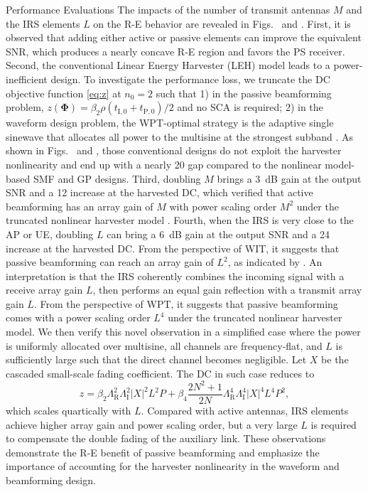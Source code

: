 \documentclass[journal]{IEEEtran}
\begin{document}
\begin{section}{Performance Evaluations}
		The impacts of the number of transmit antennas $M$ and the IRS elements $L$ on the R-E behavior are revealed in Figs.~ and . First, it is observed that adding either active or passive elements can improve the equivalent SNR, which produces a nearly concave R-E region and favors the PS receiver. Second, the conventional Linear Energy Harvester (LEH) model leads to a power-inefficient design. To investigate the performance loss, we truncate the DC objective function \eqref{eq:z} at $n_0=2$ such that 1) in the passive beamforming problem, $z(\boldsymbol{\Phi}) = {\beta_2}{\rho}(t_{\mathrm{I},0}+t_{\mathrm{P},0})/2$ and no SCA is required; 2) in the waveform design problem, the WPT-optimal strategy is the adaptive single sinewave that allocates all power to the multisine at the strongest subband \cite{Clerckx2016a}. As shown in Figs.~ and , those conventional designs do not exploit the harvester nonlinearity and end up with a nearly \SI{20}{\dBA} gap compared to the nonlinear model-based SMF and GP designs. Third, doubling $M$ brings a \SI{3}{\dB} gain at the output SNR and a \SI{12}{\dBA} increase at the harvested DC, which verified that active beamforming has an array gain of $M$ \cite{Tse2005} with power scaling order $M^2$ under the truncated nonlinear harvester model \cite{Clerckx2016a,Clerckx2018b}. Fourth, when the IRS is very close to the AP or UE, doubling $L$ can bring a \SI{6}{\dB} gain at the output SNR and a \SI{24}{\dBA} increase at the harvested DC. From the perspective of WIT, it suggests that passive beamforming can reach an array gain of $L^2$, as indicated by \cite{Wu2019}. An interpretation is that the IRS coherently combines the incoming signal with a receive array gain $L$, then performs an equal gain reflection with a transmit array gain $L$. From the perspective of WPT, it suggests that passive beamforming comes with a power scaling order $L^4$ under the truncated nonlinear harvester model. We then verify this novel observation in a simplified case where the power is uniformly allocated over multisine, all channels are frequency-flat, and $L$ is sufficiently large such that the direct channel becomes negligible. Let $X$ be the cascaded small-scale fading coefficient. The DC in such case reduces to
		\begin{equation}
			z = \beta_2 \Lambda_{\mathrm{R}}^2 \Lambda_{\mathrm{I}}^2 \lvert X \rvert^2 L^2 P + \beta_4 \frac{2N^2 + 1}{2N} \Lambda_{\mathrm{R}}^4 \Lambda_{\mathrm{I}}^4 \lvert X \rvert^4 L^4 P^2,
		\end{equation}
		which scales quartically with $L$. Compared with active antennas, IRS elements achieve higher array gain and power scaling order, but a very large $L$ is required to compensate the double fading of the auxiliary link. These observations demonstrate the R-E benefit of passive beamforming and emphasize the importance of accounting for the harvester nonlinearity in the waveform and beamforming design.


\end{section}
\end{document}
